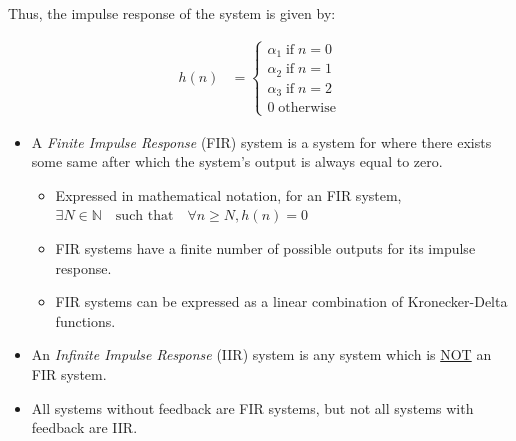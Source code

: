 \documentclass{article}
\begin{document}
Thus, the impulse response of the system is given by:

\begin{align*}
	h(n) &= \begin{cases} \alpha_1 \; \text{if} \; n = 0 \\ \alpha_2 \; \text{if} \; n = 1 \\ \alpha_3 \; \text{if} \; n = 2 \\ 0 \; \text{otherwise} \end{cases}
\end{align*}

\begin{itemize}
	\item A \emph{Finite Impulse Response} (FIR) system is a system for where there exists some same after which the system's output is always equal to zero.
		\begin{itemize}
			\item Expressed in mathematical notation, for an FIR system, $\exists N \in \mathbb{N} \quad \text{such that} \quad \forall n \ge N, h(n) = 0$
			\item FIR systems have a finite number of possible outputs for its impulse response.
			\item FIR systems can be expressed as a linear combination of Kronecker-Delta functions.
		\end{itemize}
	\item An \emph{Infinite Impulse Response} (IIR) system is any system which is \underline{NOT} an FIR system.
	\item All systems without feedback are FIR systems, but not all systems with feedback are IIR.
\end{itemize}
\end{document}
